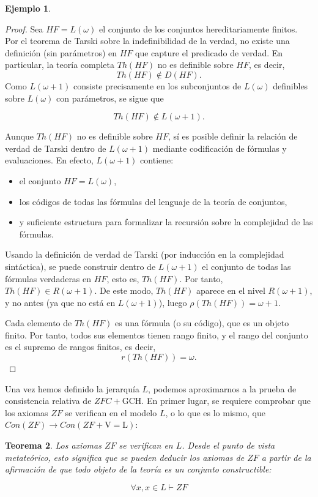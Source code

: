 \documentclass[11pt,a4paper]{book}
\theoremstyle{plain}
\newtheorem{teorema}{Teorema}[chapter]
\theoremstyle{definition}
\newtheorem{ejemplo}[teorema]{Ejemplo}
\theoremstyle{remark}
\begin{document}
\begin{ejemplo}
  \begin{proof}
Sea $HF = L(\omega)$ el conjunto de los conjuntos hereditariamente finitos. Por el teorema de Tarski sobre la indefinibilidad de la verdad, no existe una definición (sin parámetros) en $HF$ que capture el predicado de verdad. En particular, la teoría completa $Th(HF)$ no es definible sobre $HF$, es decir,
\[
Th(HF) \notin D(HF).
\]
Como $L(\omega+1)$ consiste precisamente en los subconjuntos de $L(\omega)$ definibles sobre $L(\omega)$ con parámetros, se sigue que

\[
Th(HF) \notin L(\omega+1).
\]

Aunque $Th(HF)$ no es definible sobre $HF$, sí es posible definir la relación de verdad de Tarski dentro de $L(\omega+1)$ mediante codificación de fórmulas y evaluaciones. En efecto, $L(\omega+1)$ contiene:

\begin{itemize}
    \item el conjunto $HF = L(\omega)$,
    \item los códigos de todas las fórmulas del lenguaje de la teoría de conjuntos,
    \item y suficiente estructura para formalizar la recursión sobre la complejidad de las fórmulas.
\end{itemize}

Usando la definición de verdad de Tarski (por inducción en la complejidad sintáctica), se puede construir dentro de $L(\omega+1)$ el conjunto de todas las fórmulas verdaderas en $HF$, esto es, $Th(HF)$. Por tanto, $Th(HF) \in R(\omega+1)$. De este modo, $Th(HF)$ aparece en el nivel $R(\omega+1)$, y no antes (ya que no está en $L(\omega+1)$), luego $\rho(Th(HF)) = \omega+1$.

Cada elemento de $Th(HF)$ es una fórmula (o su código), que es un objeto finito. Por tanto, todos sus elementos tienen rango finito, y el rango del conjunto es el supremo de rangos finitos, es decir,
\[
r(Th(HF)) = \omega.
\]
\end{proof}
\end{ejemplo}

Una vez hemos definido la jerarquía $L$, podemos aproximarnos a la prueba de consistencia relativa de $ZFC+\mathrm{GCH}$. En primer lugar, se requiere comprobar que los axiomas $ZF$ se verifican en el modelo $L$, o lo que es lo mismo, que $Con(ZF) \rightarrow Con(ZF+\mathrm{V=L})$:

\begin{teorema}
  Los axiomas $ZF$ se verifican en $L$. Desde el punto de vista metateórico, esto significa que se pueden deducir los axiomas de $ZF$ a partir de la afirmación de que todo objeto de la teoría es un conjunto constructible:

  $$ \forall x, x \in L \vdash ZF$$ 

\end{teorema}
\end{document}
